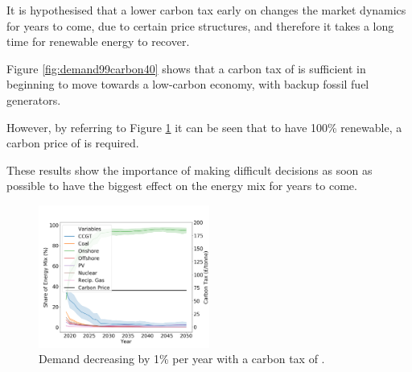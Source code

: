 It is hypothesised that a lower carbon tax early on changes the market dynamics for years to come, due to certain price structures, and therefore it takes a long time for renewable energy to recover.

Figure \ref{fig:demand99carbon40} shows that a carbon tax of  is sufficient in beginning to move towards a low-carbon economy, with backup fossil fuel generators.

However, by referring to Figure \ref{fig:demand99carbon70} it can be seen that to have 100\% renewable, a carbon price of  is required. 

These results show the importance of making difficult decisions as soon as possible to have the biggest effect on the energy mix for years to come.

\begin{figure}[h]
	\begin{center}
		\includegraphics[width=0.5\textwidth]{figures/scenarios/demand099-carbon70-datetime.png}
		\caption{Demand decreasing by 1\% per year with a carbon tax of .}
		\label{fig:demand99carbon70}
	\end{center}
\end{figure}



